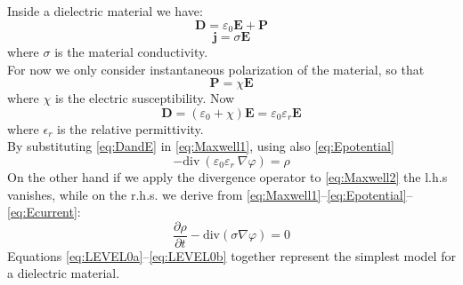 \documentclass[11pt,a4paper]{article}
\begin{document}
Inside a dielectric material we have:
\begin{equation}
	\mathbf{D} = \varepsilon_{0} \mathbf{E} + \mathbf{P}
	\label{eq:D_composition}
\end{equation}
\begin{equation}
	\mathbf{j} = \sigma \mathbf{E}
	\label{eq:Ecurrent}
\end{equation}
where \(\sigma\) is the material conductivity.\\
For now we only consider instantaneous polarization of the material, so that 
\begin{equation}
	\mathbf{P} = \chi \mathbf{E}
\end{equation}
where \(\chi\) is the electric susceptibility. Now
\begin{equation}
	\mathbf{D} = \left( \varepsilon_0+\chi\right)\mathbf{E} = \varepsilon_0\varepsilon_r\mathbf{E}
	\label{eq:DandE}
\end{equation}
where \(\epsilon_r\) is the relative permittivity.\\
By substituting \eqref{eq:DandE} in \eqref{eq:Maxwell1}, using also \eqref{eq:Epotential}
\begin{equation}\label{eq:LEVEL0a}
	- \mathrm{div}\ \left( \varepsilon_{0} \varepsilon_{r}\ \nabla \varphi
	\right)  = \rho
\end{equation}
On the other hand if we apply the divergence operator to \eqref{eq:Maxwell2} the l.h.s vanishes, while on the r.h.s. we derive from \eqref{eq:Maxwell1}--\eqref{eq:Epotential}--\eqref{eq:Ecurrent}:
\begin{equation}\label{eq:LEVEL0b}
	\dfrac{\partial \rho}{\partial t} - \mathrm{div} \left(  \sigma \nabla \varphi\right) = 0
\end{equation}
Equations \eqref{eq:LEVEL0a}--\eqref{eq:LEVEL0b} together represent the simplest model for a dielectric material.
\end{document}
